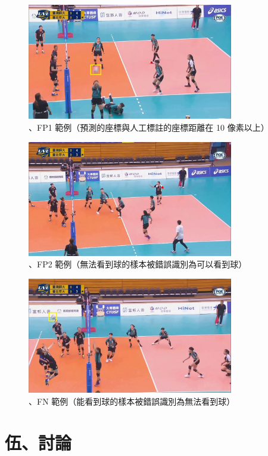 \begin{figure}[H]
    \centering
    \includegraphics[width = 9cm]{picture/FP1.jpg}
    \caption{、FP1 範例（預測的座標與人工標註的座標距離在 10 像素以上）}
    \label{FP1}
\end{figure}

\begin{figure}[H]
    \centering
    \includegraphics[width = 9cm]{picture/FP2.jpg}
    \caption{、FP2 範例（無法看到球的樣本被錯誤識別為可以看到球）}
    \label{FP2}
\end{figure}

\begin{figure}[H]
    \centering
    \includegraphics[width = 9cm]{picture/FN.jpg}
    \caption{、FN 範例（能看到球的樣本被錯誤識別為無法看到球）}
    \label{FN}
\end{figure}

\section{伍、討論}

